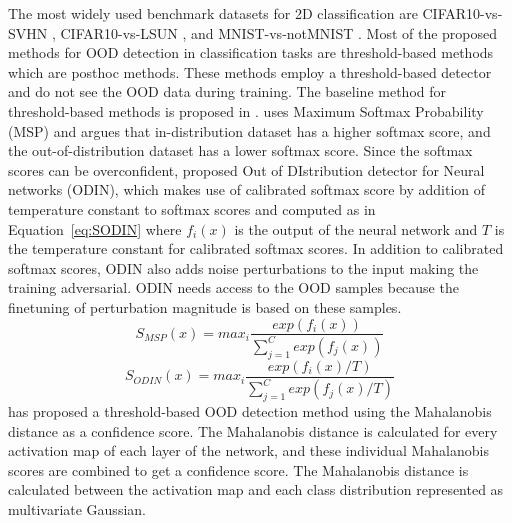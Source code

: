     The most widely used benchmark datasets for 2D classification are CIFAR10-vs-SVHN \cite{liang2017enhancing_ODIN}, CIFAR10-vs-LSUN \cite{hendrycks2016baseline_MSP}, and MNIST-vs-notMNIST \cite{hendrycks2016baseline_MSP}. 
    Most of the proposed methods for OOD detection in classification tasks are threshold-based methods which are posthoc methods.
    These methods employ a threshold-based detector and do not see the OOD data during training.
    The baseline method for threshold-based methods is proposed in \cite{hendrycks2016baseline_MSP}.
    \cite{hendrycks2016baseline_MSP} uses Maximum Softmax Probability (MSP) and argues that in-distribution dataset has a higher softmax score, and the out-of-distribution dataset has a lower softmax score.
    Since the softmax scores can be overconfident, \cite{liang2017enhancing_ODIN} proposed Out of DIstribution detector for Neural networks (ODIN), which makes use of calibrated softmax score by addition of temperature constant to softmax scores and computed as in Equation~\ref{eq:SODIN} where $f_i(x)$ is the output of the neural network and $T$ is the temperature constant for calibrated softmax scores.
    In addition to calibrated softmax scores, ODIN also adds noise perturbations to the input making the training adversarial.
    ODIN needs access to the OOD samples because the finetuning of perturbation magnitude is based on these samples.
    \begin{equation}
        S_{MSP}(x) = max_i \frac{exp(f_i(x))}{\sum^{C}_{j=1}exp(f_j(x))}  \label{eq:SMSP}
    \end{equation}
    \begin{equation}
        S_{ODIN}(x) = max_i \frac{exp(f_i(x)/T)}{\sum^{C}_{j=1}exp(f_j(x)/T)}  \label{eq:SODIN}
    \end{equation}
    \cite{lee2018simple_mahalanobis} has proposed a threshold-based OOD detection method using the Mahalanobis distance as a confidence score.
    The Mahalanobis distance is calculated for every activation map of each layer of the network, and these individual Mahalanobis scores are combined to get a confidence score.
    The Mahalanobis distance is calculated between the activation map and each class distribution represented as multivariate Gaussian.
